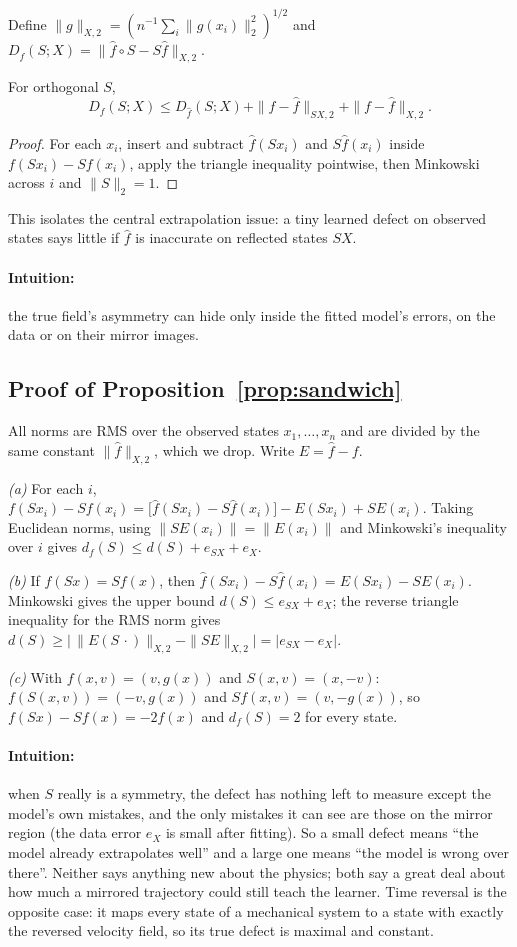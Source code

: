 Define $\|g\|_{X,2}=(n^{-1}\sum_i\|g(x_i)\|_2^2)^{1/2}$ and $D_{\widehat f}(S;X)=\|\widehat f\circ S-S\widehat f\|_{X,2}$.

\begin{proposition}
For orthogonal $S$,
\[
D_f(S;X)\le D_{\widehat f}(S;X)+\|f-\widehat f\|_{SX,2}+\|f-\widehat f\|_{X,2}.
\]
\end{proposition}
\begin{proof}
For each $x_i$, insert and subtract $\widehat f(Sx_i)$ and $S\widehat f(x_i)$ inside $f(Sx_i)-Sf(x_i)$, apply the triangle inequality pointwise, then Minkowski across $i$ and $\|S\|_2=1$.
\end{proof}
This isolates the central extrapolation issue: a tiny learned defect on observed states says little if $\widehat f$ is inaccurate on reflected states $SX$.

\paragraph{Intuition:} the true field's asymmetry can hide only inside the fitted model's errors, on the data or on their mirror images.

\subsection{Proof of Proposition~\ref{prop:sandwich}}\label{app:sandwich}
All norms are RMS over the observed states $x_1,\dots,x_n$ and are divided by the same constant $\|\widehat f\|_{X,2}$, which we drop. Write $E=\widehat f-f$.

\emph{(a)} For each $i$,
$f(Sx_i)-Sf(x_i)=\big[\widehat f(Sx_i)-S\widehat f(x_i)\big]-E(Sx_i)+SE(x_i)$.
Taking Euclidean norms, using $\|SE(x_i)\|=\|E(x_i)\|$ and Minkowski's inequality over $i$ gives $d_f(S)\le d(S)+e_{SX}+e_X$.

\emph{(b)} If $f(Sx)=Sf(x)$, then $\widehat f(Sx_i)-S\widehat f(x_i)=E(Sx_i)-SE(x_i)$. Minkowski gives the upper bound $d(S)\le e_{SX}+e_X$; the reverse triangle inequality for the RMS norm gives $d(S)\ge\big|\,\|E(S\,\cdot)\|_{X,2}-\|SE\|_{X,2}\big|=|e_{SX}-e_X|$.

\emph{(c)} With $f(x,v)=(v,g(x))$ and $S(x,v)=(x,-v)$: $f(S(x,v))=(-v,g(x))$ and $Sf(x,v)=(v,-g(x))$, so $f(Sx)-Sf(x)=-2f(x)$ and $d_f(S)=2$ for every state.

\paragraph{Intuition:} when $S$ really is a symmetry, the defect has nothing left to measure except the model's own mistakes, and the only mistakes it can see are those on the mirror region (the data error $e_X$ is small after fitting). So a small defect means ``the model already extrapolates well'' and a large one means ``the model is wrong over there''. Neither says anything new about the physics; both say a great deal about how much a mirrored trajectory could still teach the learner. Time reversal is the opposite case: it maps every state of a mechanical system to a state with exactly the reversed velocity field, so its true defect is maximal and constant.

